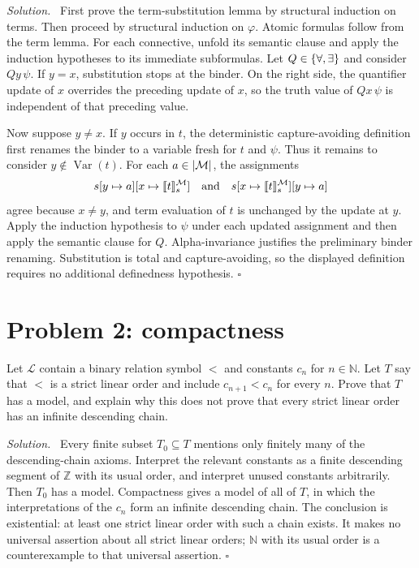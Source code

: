 \documentclass[11pt,oneside,openany]{book}
\theoremstyle{definition}
\theoremstyle{plain}
\theoremstyle{remark}
\newenvironment{solution}{\par\noindent\textit{Solution.}\ }{\hfill$\square$\par}
\DeclarePairedDelimiter{\set}{\lbrace}{\rbrace}
\DeclarePairedDelimiter{\abs}{\lvert}{\rvert}
\DeclarePairedDelimiter{\sem}{\llbracket}{\rrbracket}
\newcommand{\N}{\mathbb{N}}
\newcommand{\Z}{\mathbb{Z}}
\newcommand{\Lang}{\mathcal{L}}
\newcommand{\Meta}{\mathcal{M}}
\begin{document}
\begin{solution}
First prove the term-substitution lemma by structural induction on terms.  Then
proceed by structural induction on \(\varphi\).  Atomic formulas follow from
the term lemma.  For each connective, unfold its semantic clause and apply the
induction hypotheses to its immediate subformulas.  Let
\(Q\in\set{\forall,\exists}\) and consider \(Qy\,\psi\).  If \(y=x\),
substitution stops at the binder.  On the right side, the quantifier update of
\(x\) overrides the preceding update of \(x\), so the truth value of
\(Qx\,\psi\) is independent of that preceding value.

Now suppose \(y\neq x\).  If \(y\) occurs in \(t\), the deterministic
capture-avoiding definition first renames the binder to a variable fresh for
\(t\) and \(\psi\).  Thus it remains to consider
\(y\notin\operatorname{Var}(t)\).  For each \(a\in\abs{\Meta}\), the assignments
\[
  s[y\mapsto a][x\mapsto\sem{t}^{\Meta}_s]
  \quad\text{and}\quad
  s[x\mapsto\sem{t}^{\Meta}_s][y\mapsto a]
\]
agree because \(x\neq y\), and term evaluation of \(t\) is unchanged by the
update at \(y\).  Apply the induction hypothesis to \(\psi\) under each updated
assignment and then apply the semantic clause for \(Q\).  Alpha-invariance
justifies the preliminary binder renaming.  Substitution is total and
capture-avoiding, so the displayed definition requires no additional
definedness hypothesis.
\end{solution}

\section{Problem 2: compactness}
\label{sec:qualifying-problems-02}
\label{prob:compactness}

Let \(\Lang\) contain a binary relation symbol \(<\) and constants
\(c_n\) for \(n\in\N\).  Let \(T\) say that \(<\) is a strict linear order and
include \(c_{n+1}<c_n\) for every \(n\).  Prove that \(T\) has a model, and
explain why this does not prove that every strict linear order has an infinite
descending chain.

\begin{solution}
Every finite subset \(T_0\subseteq T\) mentions only finitely many of the
descending-chain axioms.  Interpret the relevant constants as a finite
descending segment of \(\Z\) with its usual order, and interpret unused
constants arbitrarily.  Then \(T_0\) has a model.  Compactness gives a model of
all of \(T\), in which the interpretations of the \(c_n\) form an infinite
descending chain.  The conclusion is existential: at least one strict linear
order with such a chain exists.  It makes no universal assertion about all
strict linear orders; \(\N\) with its usual order is a counterexample to that
universal assertion.
\end{solution}
\end{document}
